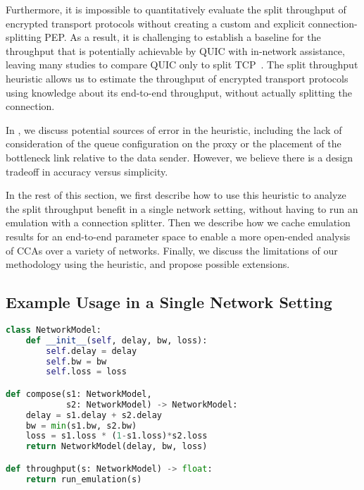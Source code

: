 Furthermore, it is impossible to quantitatively evaluate the split throughput
of encrypted transport protocols without creating a custom and explicit
connection-splitting PEP. As a result, it is challenging to establish a
baseline for the throughput that is potentially achievable by QUIC with
in-network assistance, leaving many studies to compare QUIC only to split TCP~\cite
{thomas2019google,border2020evaluating,yuan2024sidekick}. The split throughput
heuristic allows us to estimate the throughput of encrypted transport
protocols using knowledge about its end-to-end throughput, without
actually splitting the connection.

In , we discuss potential sources of error in the heuristic,
including the lack of consideration of the queue configuration on the proxy
or the placement of the bottleneck link relative to the data sender. However,
we believe there is a design tradeoff in accuracy versus simplicity.

In the rest of this section, we first describe how to use this heuristic to
analyze the split throughput benefit in a single network setting, without
having to run an emulation with a connection splitter. Then we describe how we
cache emulation results for an end-to-end parameter space to enable a more
open-ended analysis of CCAs over a variety of networks. Finally, we discuss the
limitations of our methodology using the heuristic, and propose possible
extensions.

\subsection{Example Usage in a Single Network Setting}
\label{sec:splitting:heuristic:example}

\begin{lstfloat}[t]
\begin{lstlisting}[language=Python]
class NetworkModel:
    def __init__(self, delay, bw, loss):
        self.delay = delay
        self.bw = bw
        self.loss = loss

def compose(s1: NetworkModel,
            s2: NetworkModel) -> NetworkModel:
    delay = s1.delay + s2.delay
    bw = min(s1.bw, s2.bw)
    loss = s1.loss * (1-s1.loss)*s2.loss
    return NetworkModel(delay, bw, loss)

def throughput(s: NetworkModel) -> float:
    return run_emulation(s)
\end{lstlisting}
\label{lst:multi-segment-network-model}
\end{lstfloat}

